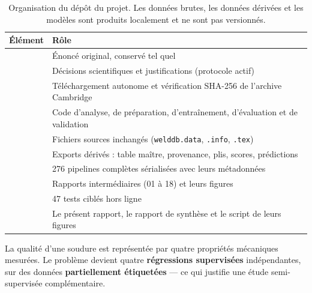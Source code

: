 \begin{table}[htbp]
\centering
\small
\caption{Organisation du dépôt du projet. Les données brutes, les données dérivées
et les modèles sont produits localement et ne sont pas versionnés.}
\label{tab:depot}
\begin{tabularx}{\textwidth}{@{}l L@{}}
\toprule
Élément & Rôle \\
\midrule
{}                   & Énoncé original, conservé tel quel \\
              & Décisions scientifiques et justifications (protocole actif) \\
  & Téléchargement autonome et vérification SHA-256 de l'archive Cambridge \\
       & Code d'analyse, de préparation, d'entraînement, d'évaluation et de validation \\
                  & Fichiers sources inchangés (\texttt{welddb.data}, \texttt{.info}, \texttt{.tex}) \\
            & Exports dérivés : table maître, provenance, plis, scores, prédictions \\
                    & 276 pipelines complètes sérialisées avec leurs métadonnées \\
                   & Rapports intermédiaires (01 à 18) et leurs figures \\
                     & 47 tests ciblés hors ligne \\
            & Le présent rapport, le rapport de synthèse et le script de leurs figures \\
\bottomrule
\end{tabularx}
\end{table}

\begin{aretenir}
La qualité d'une soudure est représentée par quatre propriétés mécaniques
mesurées. Le problème devient quatre \textbf{régressions supervisées}
indépendantes, sur des données \textbf{partiellement étiquetées} --- ce qui
justifie une étude semi-supervisée complémentaire.
\end{aretenir}
